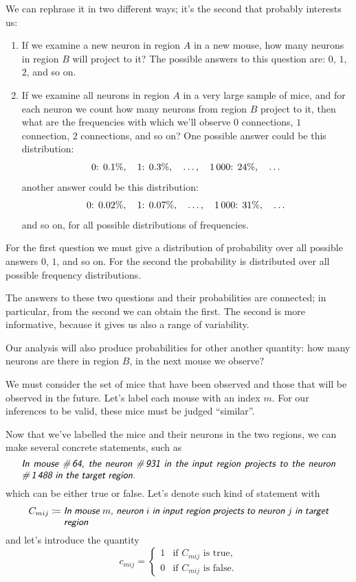 \documentclass[\ifafour a4paper,12pt,\else a5paper,10pt,\fi%
onecolumn,oneside,article,%
british%
]{memoir}
\theoremstyle{remark}
\theoremstyle{innote}
\newcommand*{\defd}{\coloneqq}
\renewcommand*{\|}[1][]{\nonscript\,#1\vert\nonscript\;\mathopen{}}
\newcommand*{\yC}{C}
\newcommand*{\yc}{c}
\newcommand*{\statm}[1]{\textsl{\textsf{#1}}}
\begin{document}
We can rephrase it in
two different ways; it's the second that probably interests us:

\begin{enumerate}[label=\textbf{Q\arabic*}.,ref=Q\arabic*]
  \item\label{item:Q1} If we examine a new neuron in region $A$ in a new
  mouse, how many neurons in region $B$ will project to it? The possible
  answers to this question are: $0$, $1$, $2$, and so on.
  \item\label{item:Q2} If we examine all neurons in region $A$ in a very
  large sample of mice, and for each neuron we count how many neurons from
  region $B$ project to it, then what are the frequencies with which we'll
  observe $0$ connections, $1$ connection, $2$ connections, and so on? One
  possible answer could be this distribution:
  \[\text{0: }0.1\%, \quad \text{1: }0.3\%, \quad\dotsc,
    \quad \text{1\,000: }24\%, \quad \dotsc\]
  another answer could be this distribution:
  \[\text{0: }0.02\%, \quad \text{1: }0.07\%, \quad\dotsc,
    \quad \text{1\,000: }31\%, \quad \dotsc\]
  and so on, for all possible distributions of frequencies.
\end{enumerate}
For the first question we must give a distribution of probability over all
possible answers $0$, $1$, and so on. For the second the probability is
distributed over all possible frequency distributions.

The answers to these two questions and their probabilities are connected;
in particular, from the second we can obtain the first. The second is more
informative, because it gives us also a range of variability.

Our analysis will also produce probabilities for other another quantity:
how many neurons are there in region $B$, in the next mouse we observe?


We must consider the set of mice that have been observed and those that will
be observed in the future. Let's label each mouse with an index $m$. For
our inferences to be valid, these mice must be judged \enquote{similar}.

Now that we've labelled the mice and their neurons in the two regions, we
can make several concrete statements, such as
\[\parbox{0.95\linewidth}{\statm{In mouse \#\,64, the neuron \#\,931 in the input
      region projects to the neuron \#\,1\,488 in the target region.}}\]
which can be either true or false. Let's denote such kind of statement with
\begin{equation}
  \label{eq:statement_connection}
  \yC_{mij} \defd \parbox[t]{0.8\linewidth}{\statm{In mouse $m$, neuron $i$ in input region projects to neuron $j$ in target region}}
\end{equation}
and let's introduce the quantity
\begin{equation}
  \label{eq:quantity_connection}
  \yc_{mij} =
  \begin{cases}
    1&\text{if $\yC_{mij}$ is true},\\
    0&\text{if $\yC_{mij}$ is false}.
  \end{cases}
\end{equation}
\end{document}
